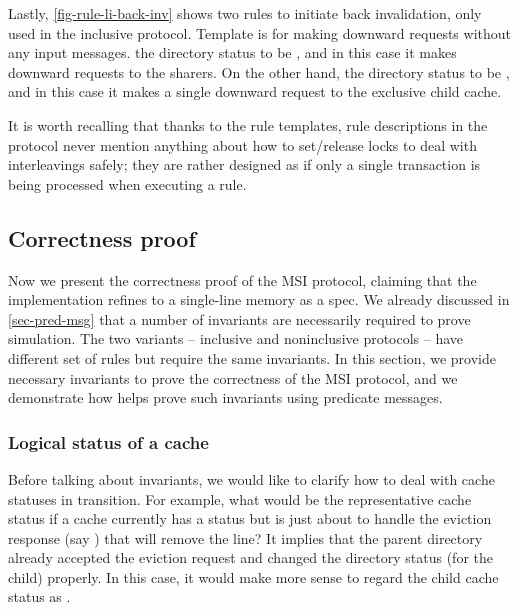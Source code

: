 Lastly, \autoref{fig-rule-li-back-inv} shows two rules to initiate back invalidation, only used in the inclusive protocol.
Template  is for making downward requests without any input messages.
  the directory status to be \stS{}, and in this case it makes downward requests to the sharers.
On the other hand,   the directory status to be \stM{}, and in this case it makes a single downward request to the exclusive child cache.

It is worth recalling that thanks to the rule templates, rule descriptions in the protocol never mention anything about how to set/release locks to deal with interleavings safely; they are rather designed as if only a single transaction is being processed when executing a rule.

\subsection{Correctness proof}
\label{sec-msi-proof}

Now we present the correctness proof of the MSI protocol, claiming that the implementation refines to a single-line memory as a spec.
We already discussed in \autoref{sec-pred-msg} that a number of invariants are necessarily required to prove simulation.
The two variants -- inclusive and noninclusive protocols -- have different set of rules but require the same invariants.
In this section, we provide necessary invariants to prove the correctness of the MSI protocol, and we demonstrate how \hemiola{} helps prove such invariants using predicate messages.

\subsubsection{Logical status of a cache}
Before talking about invariants, we would like to clarify how to deal with cache statuses in transition.
For example, what would be the representative cache status if a cache currently has a status \stS{} but is just about to handle the eviction response (say ) that will remove the line?
It implies that the parent directory already accepted the eviction request and changed the directory status (for the child) properly.
In this case, it would make more sense to regard the child cache status as \stI{}.

